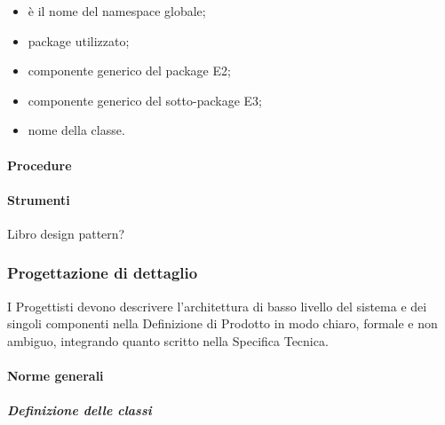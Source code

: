 \begin{itemize}
\begin{itemize}
\item {}è il nome del namespace globale;
\item {}package utilizzato;
\item {}componente generico del package E2;
\item {}componente generico del sotto-package E3;
\item {}nome della classe.
\end{itemize}
\end{itemize}


\paragraph{Procedure}

\paragraph{Strumenti}
Libro design pattern?

\subsubsection{Progettazione di dettaglio}
\label{prog_dettaglio}
I Progettisti devono descrivere l'architettura di basso livello del sistema e dei singoli componenti nella Definizione di Prodotto in modo chiaro, formale e non ambiguo, integrando quanto scritto nella Specifica Tecnica.


\paragraph{Norme generali}
\subparagraph{Definizione delle classi}
\label{}

